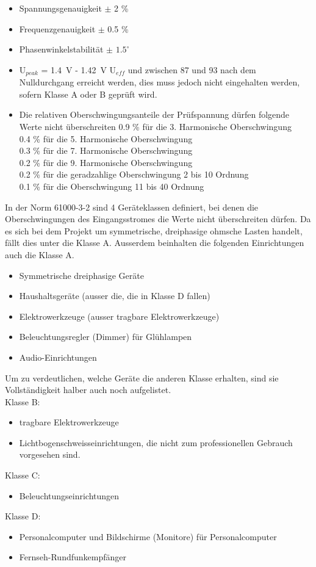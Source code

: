 \begin{itemize}
\item Spannungsgenauigkeit $\pm$ 2 \%
\item Frequenzgenauigkeit $\pm$ 0.5 \%
\item Phasenwinkelstabilität $\pm$ $1.5^\circ$
\item 	U$_{peak}$ = \SI{1.4}{V} - \SI{1.42}{V} U$_{eff}$ und zwischen 87\textdegree \hspace{0.02cm} und 93\textdegree \hspace{0.02cm} nach dem Nulldurchgang erreicht werden, dies muss jedoch nicht eingehalten werden, sofern Klasse A oder B geprüft wird.
\item Die relativen Oberschwingungsanteile der Prüfspannung dürfen folgende Werte nicht überschreiten
0.9 \% für die 3. Harmonische Oberschwingung\\
0.4 \% für die 5. Harmonische Oberschwingung\\
0.3 \% für die 7. Harmonische Oberschwingung\\
0.2 \% für die 9. Harmonische Oberschwingung\\
0.2 \% für die geradzahlige Oberschwingung 2 bis 10 Ordnung\\
0.1 \% für die Oberschwingung 11 bis 40 Ordnung\\
\end{itemize} 

In der Norm 61000-3-2 sind 4 Geräteklassen definiert, bei denen die Oberschwingungen des Eingangsstromes die Werte nicht überschreiten dürfen. Da es sich bei dem Projekt um symmetrische, dreiphasige ohmsche Lasten handelt, fällt dies unter die Klasse A. Ausserdem beinhalten die folgenden Einrichtungen auch die Klasse A. 
\begin{itemize}
\item Symmetrische dreiphasige Geräte	
\item Haushaltsgeräte (ausser die, die in Klasse D fallen)
\item Elektrowerkzeuge (ausser tragbare Elektrowerkzeuge)
\item Beleuchtungsregler (Dimmer) für Glühlampen
\item Audio-Einrichtungen
\end{itemize} 

Um zu verdeutlichen, welche Geräte die anderen Klasse erhalten, sind sie Vollständigkeit halber auch noch aufgelistet.\\
Klasse B:
\begin{itemize}
	\item tragbare Elektrowerkzeuge 	
	\item Lichtbogenschweisseinrichtungen, die nicht zum professionellen Gebrauch vorgesehen sind.
\end{itemize} 
Klasse C:
\begin{itemize}
	\item Beleuchtungseinrichtungen	
\end{itemize} 
Klasse D:
\begin{itemize}
	\item Personalcomputer und Bildschirme (Monitore) für Personalcomputer	
	\item Fernseh-Rundfunkempfänger
\end{itemize}

